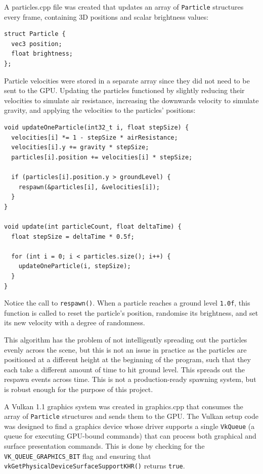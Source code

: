 \documentclass[11pt, a4paper, twocolumn]{article}
\begin{document}
A particles.cpp file was created that updates an array of \verb|Particle| structures every frame, containing 3D positions and scalar brightness values:

\begin{verbatim}
struct Particle {
  vec3 position;
  float brightness;
};
\end{verbatim}

Particle velocities were stored in a separate array since they did not need to be sent to the GPU. Updating the particles functioned by slightly reducing their velocities to simulate air resistance, increasing the downwards velocity to simulate gravity, and applying the velocities to the particles' positions:

\begin{verbatim}
void updateOneParticle(int32_t i, float stepSize) {
  velocities[i] *= 1 - stepSize * airResistance;
  velocities[i].y += gravity * stepSize;
  particles[i].position += velocities[i] * stepSize;

  if (particles[i].position.y > groundLevel) {
    respawn(&particles[i], &velocities[i]);
  }
}

void update(int particleCount, float deltaTime) {
  float stepSize = deltaTime * 0.5f;

  for (int i = 0; i < particles.size(); i++) {
    updateOneParticle(i, stepSize);
  }
}
\end{verbatim}

Notice the call to \verb|respawn()|. When a particle reaches a ground level \verb|1.0f|, this function is called to reset the particle's position, randomise its brightness, and set its new velocity with a degree of randomness.

This algorithm has the problem of not intelligently spreading out the particles evenly across the scene, but this is not an issue in practice as the particles are positioned at a different height at the beginning of the program, such that they each take a different amount of time to hit ground level. This spreads out the respawn events across time. This is not a production-ready spawning system, but is robust enough for the purpose of this project.

A Vulkan 1.1 graphics system was created in graphics.cpp that consumes the array of \verb|Particle| structures and sends them to the GPU. The Vulkan setup code was designed to find a graphics device whose driver supports a single \verb|VkQueue| (a queue for executing GPU-bound commands) that can process both graphical and surface presentation commands. This is done by checking for the \verb|VK_QUEUE_GRAPHICS_BIT| flag and ensuring that \verb|vkGetPhysicalDeviceSurfaceSupportKHR()| returns \verb|true|.
\end{document}
